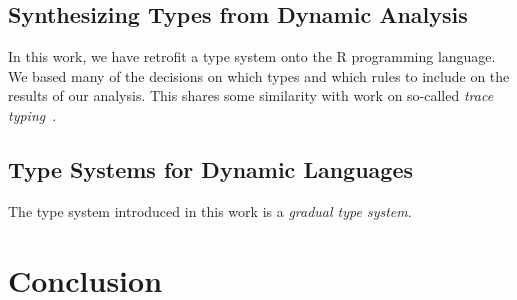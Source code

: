 \documentclass[sigplan,10pt,review,anonymous]{acmart}\settopmatter{printfolios=true,printccs=false,printacmref=false}
\begin{document}
%
%
%
%
\subsection{Synthesizing Types from Dynamic Analysis}

In this work, we have retrofit a type system onto the R programming language.
We based many of the decisions on which types and which rules to include on the results of our analysis.
This shares some similarity with work on so-called {\it trace typing}~\cite{andreasen2016trace}.

%
%
%
%
\subsection{Type Systems for Dynamic Languages}

The type system introduced in this work is a {\it gradual type system}.

%
%
%
%
%
\section{Conclusion}



%
%
%


\end{document}
